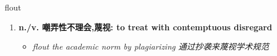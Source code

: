 
\begin{frame}
{\huge flout}
\begin{center}
\begin{enumerate}\Large
  \item \textbf{n./v. 嘲弄性不理会,蔑视: to treat with contemptuous disregard}
  \begin{itemize}
    \item \em{\Large{flout the academic norm by plagiarizing 通过抄袭来蔑视学术规范}}
  \end{itemize}
\end{enumerate}
\end{center}
\end{frame}
